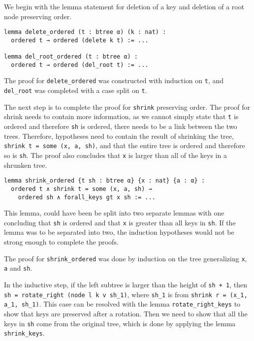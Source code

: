 We begin with the lemma statement for deletion of a key and deletion of a root node preserving order.

\begin{lstlisting}
lemma delete_ordered (t : btree α) (k : nat) :
  ordered t → ordered (delete k t) := ...

lemma del_root_ordered (t : btree α) :
  ordered t → ordered (del_root t) := ...
\end{lstlisting}

The proof for \lstinline{delete_ordered} was constructed with induction on \lstinline{t}, and \lstinline{del_root} was completed with a case split on \lstinline{t}.

The next step is to complete the proof for \lstinline{shrink} preserving order. The proof for shrink needs to contain more information, as we cannot simply state that \lstinline{t} is ordered and therefore \lstinline{sh} is ordered, there needs to be a link between the two trees. Therefore, hypotheses need to contain the result of shrinking the tree, \lstinline{shrink t = some (x, a, sh)}, and that the entire tree is ordered and therefore so is \lstinline{sh}. The proof also concludes that \lstinline{x} is larger than all of the keys in a shrunken tree.

\begin{lstlisting}
lemma shrink_ordered {t sh : btree α} {x : nat} {a : α} :
  ordered t ∧ shrink t = some (x, a, sh) →
    ordered sh ∧ forall_keys gt x sh := ...
\end{lstlisting}

This lemma, could have been be split into two separate lemmas with one concluding that \lstinline{sh} is ordered and that \lstinline{x} is greater than all keys in \lstinline{sh}. If the lemma was to be separated into two, the induction hypotheses would not be strong enough to complete the proofs.

The proof for \lstinline{shrink_ordered} was done by induction on the tree generalizing \lstinline{x}, \lstinline{a} and \lstinline{sh}.

In the inductive step, if the left subtree is larger than the height of \lstinline{sh + 1}, then \lstinline{sh = rotate_right (node l k v sh_1)}, where \lstinline{sh_1} is from \lstinline{shrink r = (x_1, a_1, sh_1)}. This case can be resolved with the lemma \lstinline{rotate_right_keys} to show that keys are preserved after a rotation. Then we need to show that all the keys in \lstinline{sh} come from the original tree, which is done by applying the lemma \lstinline{shrink_keys}.

